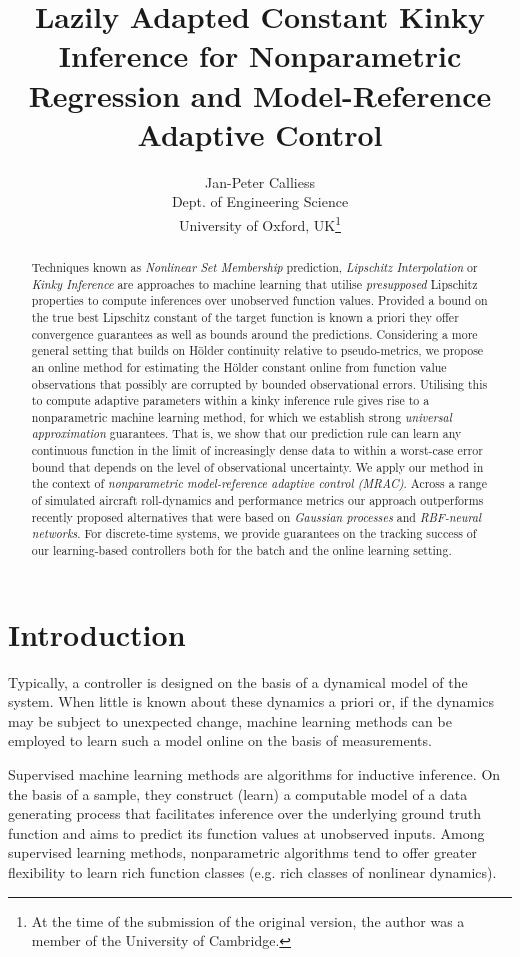 \documentclass{article} %
\title{Lazily Adapted Constant Kinky Inference for Nonparametric Regression and Model-Reference Adaptive Control}
\author{
Jan-Peter Calliess\\ 
Dept. of Engineering Science\\
University of Oxford, UK\footnote{At the time of the submission of the original version, the author was a member of the University of Cambridge.}
}
\theoremstyle{definition}
\theoremstyle{remark}
\begin{document}
\maketitle
\begin{abstract}
Techniques known as \emph{Nonlinear Set Membership} prediction, \emph{Lipschitz Interpolation} or \emph{Kinky Inference} are  approaches to machine learning that utilise \emph{presupposed} Lipschitz properties to compute inferences over unobserved function values. Provided a bound on the true best Lipschitz constant of the target function is known a priori they offer convergence guarantees as well as bounds around the predictions.
Considering a more general setting that builds on H\"older continuity relative to pseudo-metrics, we propose an online method for estimating the H\"older constant online from function value observations that possibly are corrupted by bounded observational errors. Utilising this to compute  adaptive parameters within a kinky inference rule gives rise to a nonparametric machine learning method, for which we establish strong \emph{universal approximation} guarantees. That is, we show that our prediction rule can learn any continuous function in the limit of increasingly dense data to within a worst-case error bound that depends on the level of observational uncertainty.
We apply our method in the context of \emph{nonparametric model-reference adaptive control (MRAC)}. 
Across a range of simulated aircraft roll-dynamics and performance metrics our approach outperforms recently proposed alternatives that were based on \emph{Gaussian processes} and \emph{RBF-neural networks}. For discrete-time systems, we provide guarantees on the tracking success of our learning-based controllers both for the batch and the online learning setting. 
\end{abstract}


\section{Introduction}

Typically, a controller is designed on the basis of a dynamical model of the system. When little is known about these dynamics a priori or, if the dynamics may be subject to unexpected change, machine learning methods can be employed to learn such a model online on the basis of measurements. 

Supervised machine learning methods are algorithms for inductive inference. On the basis of a sample, they construct (learn) a computable model of a data generating process that facilitates inference over the underlying ground truth function and aims to predict its function values at unobserved inputs.
%
Among supervised learning methods, nonparametric algorithms tend to offer greater flexibility to learn rich 
function classes (e.g. rich classes of nonlinear dynamics). 
 
\end{document}
